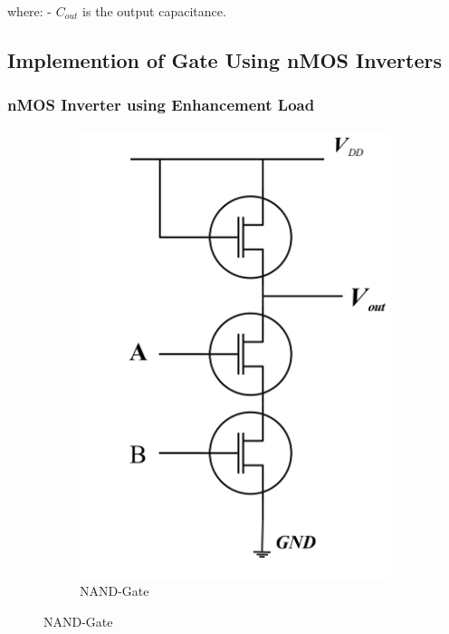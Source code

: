 \documentclass[a4paper,12pt]{article}
\begin{document}
where:
- \( C_{out} \) is the output capacitance.
\newpage
	\subsection{Implemention of Gate Using nMOS Inverters}
	\subsubsection{nMOS Inverter using Enhancement Load}
	
	\begin{figure}[H]
		\centering
		
		\begin{subfigure}[t]{0.49\textwidth}
			\centering
			\includegraphics[width=0.7\linewidth]{../EXP04_EEE2214/Images/mos/3}
			
			\caption{NAND-Gate}
			

\end{subfigure}
\end{figure}
\end{document}
